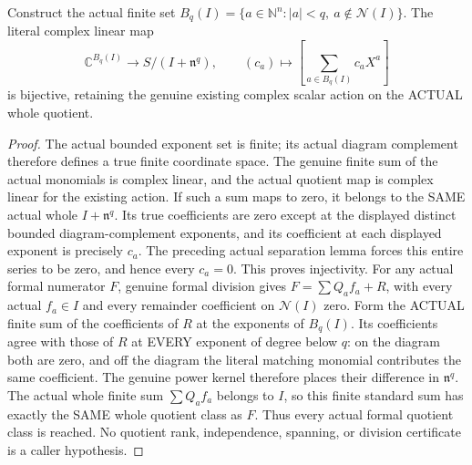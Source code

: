 \begin{theorem}
\label{hir:actual-formal-standard-monomial-whole-jet-basis}
Construct the actual finite set
$B_q(I)=\{a\in\mathbb N^n:|a|<q,\ a\notin\mathcal N(I)\}$.
The literal complex linear map
\[
 \mathbb C^{B_q(I)}\longrightarrow S/(I+\mathfrak n^q),\qquad
 (c_a)\longmapsto\left[\sum_{a\in B_q(I)}c_aX^a\right]
\]
is bijective, retaining the genuine existing complex scalar action on
the ACTUAL whole quotient.
\leanok
\end{theorem}
\begin{proof}
The actual bounded exponent set is finite; its actual diagram complement
therefore defines a true finite coordinate space. The genuine finite sum
of the actual monomials is complex linear, and the actual quotient map
is complex linear for the existing action.
If such a sum maps to zero, it belongs to the SAME actual whole
$I+\mathfrak n^q$. Its true coefficients are zero except at the
displayed distinct bounded diagram-complement exponents, and its
coefficient at each displayed exponent is precisely $c_a$. The preceding
actual separation lemma forces this entire series to be zero, and hence
every $c_a=0$. This proves injectivity.
For any actual formal numerator $F$, genuine formal division gives
$F=\sum Q_af_a+R$, with every actual $f_a\in I$ and every remainder
coefficient on $\mathcal N(I)$ zero. Form the ACTUAL finite sum of the
coefficients of $R$ at the exponents of $B_q(I)$. Its coefficients
agree with those of $R$ at EVERY exponent of degree below $q$: on the
diagram both are zero, and off the diagram the literal matching
monomial contributes the same coefficient. The genuine power kernel
therefore places their difference in $\mathfrak n^q$. The actual
whole finite sum $\sum Q_af_a$ belongs to $I$, so this finite standard
sum has exactly the SAME whole quotient class as $F$. Thus every actual
formal quotient class is reached. No quotient rank, independence,
spanning, or division certificate is a caller hypothesis.
\end{proof}

